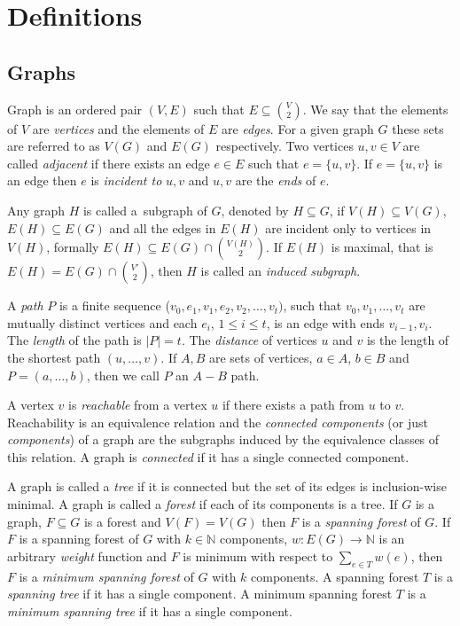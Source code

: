 
\chapter{Definitions}

\section{Graphs}
Graph is an ordered pair $(V,E)$ such that $E \subseteq {V \choose 2}$. We say that the elements of $V$ are \textit{vertices} and the elements of $E$ are \textit{edges}. For a given graph $G$ these sets are referred to as $V(G)$ and $E(G)$ respectively. Two vertices $u,v \in V$ are called \textit{adjacent} if there exists an edge $e \in E$ such that $e = \{u,v\}$. If $e = \{u, v\}$ is an edge then $e$ is \textit{incident to} $u,v$ and $u,v$ are the \textit{ends} of $e$.

Any graph $H$ is called a~subgraph of $G$, denoted by $H \subseteq G$, if $V(H) \subseteq V(G)$, $E(H) \subseteq E(G)$ and all the edges in $E(H)$ are incident only to vertices in $V(H)$, formally $E(H) \subseteq E(G) \cap {V(H) \choose 2}$. If $E(H)$ is maximal, that is $E(H) = E(G) \cap { V' \choose 2 }$, then $H$ is called an \textit{induced subgraph}.

A \textit{path} $P$ is a finite sequence ($v_0,e_1,v_1,e_2,v_2,\ldots,v_t)$, such that $v_0, v_1,\ldots,v_t$ are mutually distinct vertices and each $e_i$, $1 \leq i \leq t$, is an edge with ends $v_{i-1}, v_i$. The \textit{length} of the path is $\lvert P \rvert = t$. The \textit{distance} of vertices $u$ and $v$ is the length of the shortest path $(u,\ldots,v)$. If $A,B$ are sets of vertices, $a \in A$, $b \in B$ and $P = (a,\ldots,b)$, then we call $P$ an $A{-}B$ path.

A vertex $v$ is \textit{reachable} from a vertex $u$ if there exists a path from $u$ to $v$. Reachability is an equivalence relation and the \textit{connected components} (or just \textit{components}) of a graph are the subgraphs induced by the equivalence classes of this relation. A graph is \textit{connected} if it has a single connected component.

A graph is called a \textit{tree} if it is connected but the set of its edges is inclusion-wise minimal. A graph is called a \textit{forest} if each of its components is a tree. If $G$ is a graph, $F \subseteq G$ is a forest and $V(F) = V(G)$ then $F$ is a \textit{spanning forest} of $G$. If $F$ is a spanning forest of $G$ with $k \in \mathbb{N}$ components, $w : E(G) \rightarrow \mathbb{N}$ is an arbitrary \textit{weight} function and $F$ is minimum with respect to $\sum_{e \in T} w(e)$, then $F$ is a \textit{minimum spanning forest} of $G$ with $k$ components. A spanning forest $T$ is a \textit{spanning tree} if it has a single component. A minimum spanning forest $T$ is a \textit{minimum spanning tree} if it has a single component.

